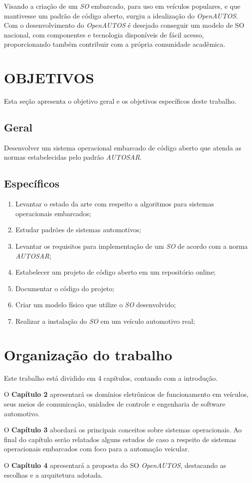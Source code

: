 Visando a criação de um \emph{SO} embarcado, para uso em veículos populares, e que mantivesse um padrão de código aberto, surgiu a idealização do \emph{OpenAUTOS}. Com o desenvolvimento do \emph{OpenAUTOS} é desejado conseguir um modelo de SO nacional, com componentes e tecnologia disponíveis de fácil acesso, proporcionando também contribuir com a própria comunidade acadêmica.

\section{OBJETIVOS}

Esta seção apresenta o objetivo geral e os objetivos específicos deste trabalho.

\subsection{Geral}

Desenvolver um sistema operacional embarcado de código aberto que atenda as normas estabelecidas pelo padrão \emph{AUTOSAR}.

\subsection{Específicos}
\begin{enumerate}
	\item Levantar o estado da arte com respeito a algoritmos para sistemas operacionais embarcados;
	\item Estudar padrões de sistemas automotivos;
	\item Levantar os requisitos para implementação de um \emph{SO} de acordo com a norma \emph{AUTOSAR};
	\item Estabelecer um projeto de código aberto em um repositório online;
	\item Documentar o código do projeto;
	\item Criar um modelo físico que utilize o \emph{SO} desenvolvido;
	\item Realizar a instalação do \emph{SO} em um veículo automotivo real;
\end{enumerate}

\section{Organização do trabalho}

Este trabalho está dividido em 4 capítulos, contando com a introdução.

O \textbf{Capítulo 2} apresentará os domínios eletrônicos de funcionamento em veículos, seus meios de comunicação, unidades de controle e engenharia de software automotivo.

O \textbf{Capítulo 3} abordará os principais conceitos sobre sistemas operacionais. Ao final do capítulo serão relatados alguns estudos de caso a respeito de sistemas operacionais embarcados com foco para a automação veicular.

O \textbf{Capítulo 4} apresentará a proposta do SO \emph{OpenAUTOS}, destacando as escolhas e a arquitetura adotada.
